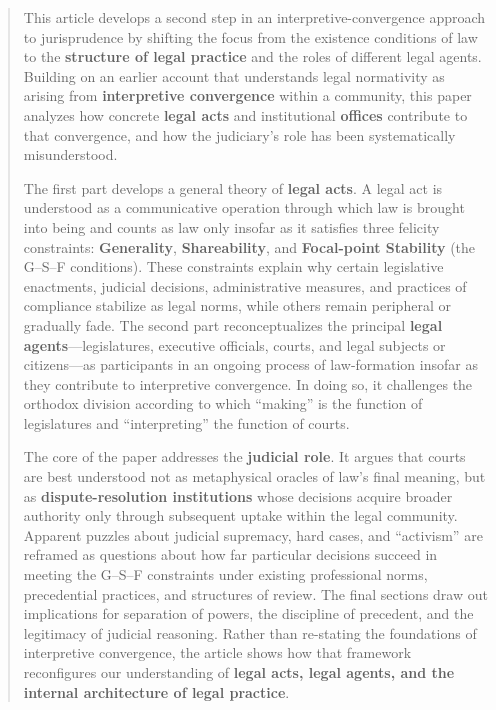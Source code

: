 \documentclass[12pt,a4paper]{article}
\begin{document}
\begin{abstract}

This article develops a second step in an interpretive-convergence
approach to jurisprudence by shifting the focus from the existence
conditions of law to the \textbf{structure of legal practice} and the
roles of different legal agents. Building on an earlier account that
understands legal normativity as arising from \textbf{interpretive
convergence} within a community, this paper analyzes how concrete
\textbf{legal acts} and institutional \textbf{offices} contribute to
that convergence, and how the judiciary's role has been systematically
misunderstood.

The first part develops a general theory of \textbf{legal acts}. A legal
act is understood as a communicative operation through which law is
brought into being and counts as law only insofar as it satisfies three
felicity constraints: \textbf{Generality}, \textbf{Shareability}, and
\textbf{Focal-point Stability} (the G--S--F conditions). These
constraints explain why certain legislative enactments, judicial
decisions, administrative measures, and practices of compliance
stabilize as legal norms, while others remain peripheral or gradually
fade. The second part reconceptualizes the principal \textbf{legal
agents}---legislatures, executive officials, courts, and legal subjects
or citizens---as participants in an ongoing process of law-formation
insofar as they contribute to interpretive convergence. In doing so, it
challenges the orthodox division according to which ``making'' is the
function of legislatures and ``interpreting'' the function of courts.

The core of the paper addresses the \textbf{judicial role}. It argues
that courts are best understood not as metaphysical oracles of law's
final meaning, but as \textbf{dispute-resolution institutions} whose
decisions acquire broader authority only through subsequent uptake
within the legal community. Apparent puzzles about judicial supremacy,
hard cases, and ``activism'' are reframed as questions about how far
particular decisions succeed in meeting the G--S--F constraints under
existing professional norms, precedential practices, and structures of
review. The final sections draw out implications for separation of
powers, the discipline of precedent, and the legitimacy of judicial
reasoning. Rather than re-stating the foundations of interpretive
convergence, the article shows how that framework reconfigures our
understanding of \textbf{legal acts, legal agents, and the internal
architecture of legal practice}.

\end{abstract}
\end{document}
